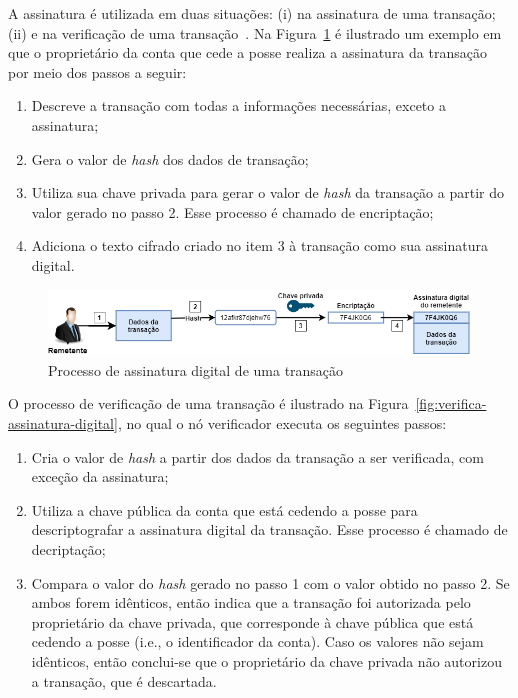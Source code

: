 A assinatura é utilizada em duas situações: (i) na assinatura de uma transação; (ii) e na verificação de uma transação~\cite{overview-ahmed-2019}. Na Figura~\ref{fig:retemente-assinatura-digital} é ilustrado um exemplo em que o proprietário da conta que cede a posse realiza a assinatura da transação por meio dos passos a seguir:
\begin{enumerate}
    \item Descreve a transação com todas a informações necessárias, exceto a assinatura;
    \item Gera o valor de \textit{hash} dos dados de transação;
    \item Utiliza sua chave privada para gerar o valor de \textit{hash} da transação a partir do valor gerado no passo 2. Esse processo é chamado de encriptação;
    \item Adiciona o texto cifrado criado no item 3 à transação como sua assinatura digital.
\end{enumerate}

\begin{figure}[htb]
 \caption{Processo de assinatura digital de uma transação}
 \label{fig:retemente-assinatura-digital}
 \centering
 \includegraphics[scale=0.6]{figuras/remetente_assinatura_digital.png}
\end{figure}

O processo de verificação de uma transação é ilustrado na Figura~\ref{fig:verifica-assinatura-digital}, no qual o nó verificador executa os seguintes passos:
\begin{enumerate}
    \item Cria o valor de \textit{hash} a partir dos dados da transação a ser verificada, com exceção da assinatura;
    \item Utiliza a chave pública da conta que está cedendo a posse para descriptografar a assinatura digital da transação. Esse processo é chamado de decriptação;
    \item Compara o valor do \textit{hash} gerado no passo 1 com o valor obtido no passo 2. Se ambos forem idênticos, então indica que a transação foi autorizada pelo proprietário da chave privada, que corresponde à chave pública que está cedendo a posse (i.e., o identificador da conta). Caso os valores não sejam idênticos, então conclui-se que o proprietário da chave privada não autorizou a transação, que é descartada. 
\end{enumerate}

